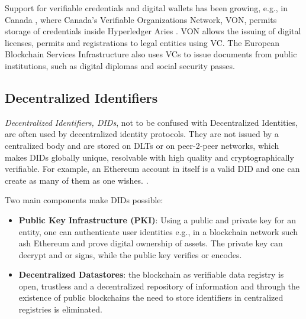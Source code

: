 Support for verifiable credentials and digital wallets has been growing, e.g., in Canada \cite{preukschat2021self},
where Canada's Verifiable Organizations Network, VON, permits storage of credentials inside Hyperledger Aries
\cite{hyperledger:wiki}. VON allows the issuing of digital licenses, permits and registrations to legal entities using
VC.
The European Blockchain Services Infrastructure also uses VCs to issue documents from public institutions, such as
digital diplomas and social security passes. \cite{williams2020cross}

\subsection{Decentralized Identifiers} %
\label{sec:Decentralized Identifiers}
\textit{Decentralized Identifiers, DIDs}, not to be confused with Decentralized Identities, are often used by
decentralized identity protocols. \cite{world2022did} They are not issued by a centralized body and are stored on DLTs
or on peer-2-peer networks, which makes DIDs globally unique, resolvable with high quality and cryptographically
verifiable. \cite{w3c-did-primer} For example, an Ethereum account in itself is a valid DID and one can create as many
of them as one wishes. \cite{eth-decentralized-identity}.

Two main components make DIDs possible: \cite{eth-decentralized-identity}
\begin{itemize}
	\item \textbf{Public Key Infrastructure (PKI)}: Using a public and private key for an entity, one can
	      authenticate user identities e.g., in a blockchain network such ash Ethereum and prove digital ownership
	      of assets.
	      The private key can decrypt and or signs, while the public key verifies or encodes.
	\item \textbf{Decentralized Datastores}: the blockchain as verifiable data registry is open, trustless and a
	      decentralized repository of information and through the existence of public blockchains the need to store
	      identifiers in centralized registries is eliminated.
\end{itemize}

